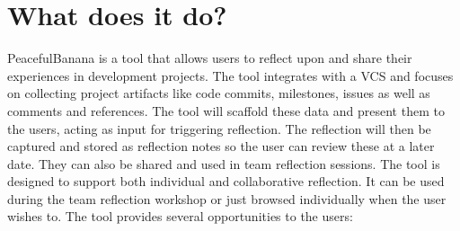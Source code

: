\section{What does it do?}
PeacefulBanana is a tool that allows users to reflect upon and share their experiences in development projects. The tool integrates with a VCS and focuses on collecting project artifacts like code commits, milestones, issues as well as comments and references. The tool will scaffold these data and present them to the users, acting as input for triggering reflection. The reflection will then be captured and stored as reflection notes so the user can review these at a later date. They can also be shared and used in team reflection sessions. The tool is designed to support both individual and collaborative reflection. It can be used during the team reflection workshop or just browsed individually when the user wishes to. The tool provides several opportunities to the users:
